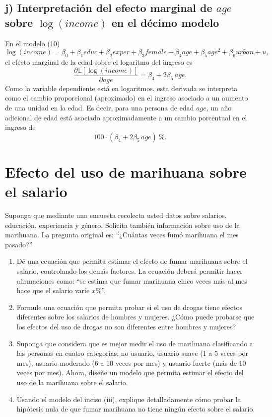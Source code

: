 \documentclass[12pt]{article}
\begin{document}
\subsection*{j) Interpretación del efecto marginal de $age$ sobre $\log(income)$ en el décimo modelo}
En el modelo (10)
\[
\log(income) = \beta_{0} + \beta_{1}educ + \beta_{2}exper + \beta_{3}female + \beta_{4}age + \beta_{5}age^{2} + \beta_{6}urban + u,
\]
el efecto marginal de la edad sobre el logaritmo del ingreso es
\[
\frac{\partial \mathbb{E}[\log(income)]}{\partial age} = \beta_{4} + 2\beta_{5}\,age.
\]
Como la variable dependiente está en logaritmos, esta derivada se interpreta como el cambio proporcional (aproximado) en el ingreso asociado a un aumento de una unidad en la edad. Es decir, para una persona de edad \(age\), un año adicional de edad está asociado aproximadamente a un cambio porcentual en el ingreso de
\[
100\cdot(\beta_{4} + 2\beta_{5}\,age)\ \%.
\]

\section{Efecto del uso de marihuana sobre el salario}

Suponga que mediante una encuesta recolecta usted datos sobre salarios, educación, experiencia y género. 
Solicita también información sobre uso de la marihuana. 
La pregunta original es: ``¿Cuántas veces fumó marihuana el mes pasado?''

\begin{enumerate}[label=\textbf{\alph*.}]
    \item Dé una ecuación que permita estimar el efecto de fumar marihuana sobre el salario, controlando los demás factores. 
    La ecuación deberá permitir hacer afirmaciones como: 
    ``se estima que fumar marihuana cinco veces más al mes hace que el salario varíe $x\%$''.
    
    \item Formule una ecuación que permita probar si el uso de drogas tiene efectos diferentes sobre los salarios de hombres y mujeres. 
    ¿Cómo puede probarse que los efectos del uso de drogas no son diferentes entre hombres y mujeres?
    
    \item Suponga que considera que es mejor medir el uso de marihuana clasificando a las personas en cuatro categorías: 
    no usuario, usuario suave (1 a 5 veces por mes), usuario moderado (6 a 10 veces por mes) y usuario fuerte (más de 10 veces por mes). 
    Ahora, diseñe un modelo que permita estimar el efecto del uso de la marihuana sobre el salario.
    
    \item Usando el modelo del inciso (iii), explique detalladamente cómo probar la hipótesis nula de que fumar marihuana no tiene ningún efecto sobre el salario.
\end{enumerate}
\end{document}

